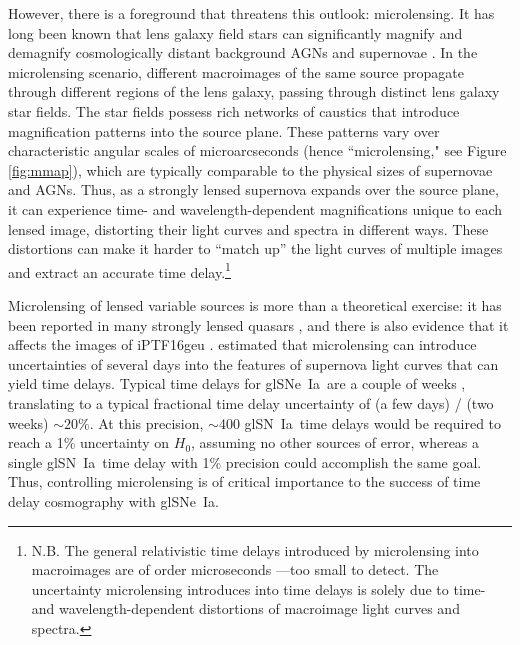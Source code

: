 \documentclass[iop,apj,numberedappendix,twocolappendix]{emulateapj}
\newcommand{\snia}{{\rm SN~Ia}}
\newcommand{\sneia}{{\rm SNe~Ia}}
\begin{document}
However, there is a foreground that threatens this outlook: microlensing. 
It has long been known that lens galaxy field stars can significantly magnify and demagnify cosmologically distant background AGNs \citep{ml} and supernovae \citep{dk06,bag06}.
In the microlensing scenario, different macroimages of the same source propagate through different regions of the lens galaxy, passing through distinct lens galaxy star fields. 
The star fields possess rich networks of caustics that introduce magnification patterns into the source plane.
These patterns vary over characteristic angular scales of microarcseconds (hence ``microlensing," see Figure \ref{fig:mmap}), which are typically comparable to the physical sizes of supernovae and AGNs.
Thus, as a strongly lensed supernova expands over the source plane, it can experience time- and wavelength-dependent magnifications unique to each lensed image, distorting their light curves and spectra in different ways. 
These distortions can make it harder to ``match up'' the light curves of multiple images and extract an accurate time delay.\footnote{N.B. The general relativistic time delays introduced by microlensing into macroimages are of order microseconds \citep{moore96}---too small to detect.
The uncertainty microlensing introduces into time delays is solely due to time- and wavelength-dependent distortions of macroimage light curves and spectra.}

Microlensing of lensed variable sources is more than a theoretical exercise: it has been reported in many strongly lensed quasars \citep[e.g.,][]{cml}, and there is also evidence that it affects the images of iPTF16geu \citep{more16}.
\cite{dk06} estimated that microlensing can introduce uncertainties of several days into the features of supernova light curves that can yield time delays.
Typical time delays for gl\sneia\ are a couple of weeks \citep{gn17},  translating to a typical fractional time delay uncertainty of (a few days) / (two weeks) $\sim20\%$. 
At this precision, $\sim$400 gl\snia\ time delays would be required to reach a 1\% uncertainty on $H_0$, assuming no other sources of error, whereas a single gl\snia\ time delay with 1\% precision could accomplish the same goal.
Thus, controlling microlensing is of critical importance to the success of time delay cosmography with gl\sneia.
\end{document}
